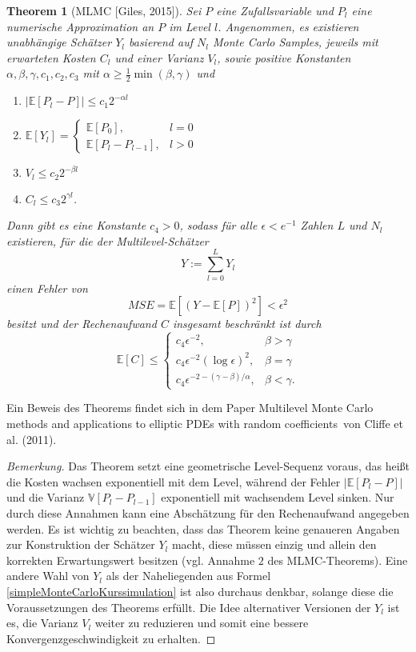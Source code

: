 \documentclass[10pt,a4paper]{article}
\newtheorem*{theorem*}{Theorem}
\newenvironment{bemerkung}{\begin{proof}[Bemerkung]}{\end{proof}}
\begin{document}
\begin{theorem*}[MLMC $\lbrack$Giles, 2015$\rbrack$]
	Sei $P$ eine Zufallsvariable und $P_l$ eine numerische Approximation an $P$ im Level $l$. Angenommen, es existieren unabhängige Schätzer $Y_l$ basierend auf $N_l$ Monte Carlo Samples, jeweils mit erwarteten Kosten $C_l$ und einer Varianz $V_l$, sowie positive Konstanten $\alpha,\beta,\gamma,c_1,c_2,c_3$ mit $\alpha\geq\frac{1}{2}\min(\beta,\gamma)$ und
	\begin{enumerate}
		\item $|\mathbb{E}[P_l-P]|\leq c_1 2^{-\alpha l}$
		\item $\mathbb{E}[Y_l]=\begin{cases}\mathbb{E}[P_0], & l=0 \\ \mathbb{E}[P_l-P_{l-1}], & l>0\end{cases}$
		\item $V_l\leq c_2 2^{-\beta l}$
		\item $C_l\leq c_3 2^{\gamma l}$.
	\end{enumerate}
	Dann gibt es eine Konstante $c_4>0$, sodass für alle $\epsilon<e^{-1}$ Zahlen $L$ und $N_l$ existieren, für die der Multilevel-Schätzer
	\[
		Y:=\sum\limits_{l=0}^L Y_l
	\]
	einen Fehler von
	\[
		MSE=\mathbb{E}\left[(Y-\mathbb{E}[P])^2\right]<\epsilon^2
	\]
	besitzt und der Rechenaufwand $C$ insgesamt beschränkt ist durch
	\[
		\mathbb{E}[C]\leq\begin{cases}c_4\epsilon^{-2}, & \beta>\gamma \\ c_4\epsilon^{-2}(\log\epsilon)^2, & \beta=\gamma \\ c_4\epsilon^{-2-(\gamma-\beta)/\alpha}, & \beta<\gamma.\end{cases}
	\]
\end{theorem*}
\vspace{0.5cm}
Ein Beweis des Theorems findet sich in dem Paper \glqq Multilevel Monte Carlo methods and applications to elliptic PDEs with random coefficients\grqq\ von Cliffe et al. (2011).
\begin{bemerkung}Das Theorem setzt eine geometrische Level-Sequenz voraus, das heißt die Kosten wachsen exponentiell mit dem Level, während der Fehler $|\mathbb{E}[P_l-P]|$ und die Varianz $\mathbb{V}[P_l-P_{l-1}]$ exponentiell mit wachsendem Level sinken. Nur durch diese Annahmen kann eine Abschätzung für den Rechenaufwand angegeben werden. Es ist wichtig zu beachten, dass das Theorem keine genaueren Angaben zur Konstruktion der Schätzer $Y_l$ macht, diese müssen einzig und allein den korrekten Erwartungswert besitzen (vgl. Annahme $\mathit{2}$ des MLMC-Theorems). Eine andere Wahl von $Y_l$ als der Naheliegenden aus Formel \eqref{simpleMonteCarloKurssimulation} ist also durchaus denkbar, solange diese die Voraussetzungen des Theorems erfüllt. Die Idee alternativer Versionen der $Y_l$ ist es, die Varianz $V_l$ weiter zu reduzieren und somit eine bessere Konvergenzgeschwindigkeit zu erhalten.
\end{bemerkung}
\end{document}
